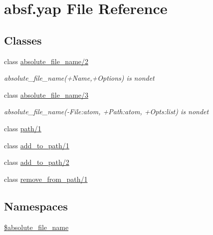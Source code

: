 \section{absf.\+yap File Reference}
\label{absf_8yap}
\subsection*{Classes}
\begin{DoxyCompactItemize}
\item 
class \hyperlink{classabsolute__file__name_22}{absolute\+\_\+file\+\_\+name/2}
\begin{DoxyCompactList}\small\item\em absolute\+\_\+file\+\_\+name(+{\itshape Name},+{\itshape Options}) is nondet \end{DoxyCompactList}\item 
class \hyperlink{classabsolute__file__name_23}{absolute\+\_\+file\+\_\+name/3}
\begin{DoxyCompactList}\small\item\em absolute\+\_\+file\+\_\+name(-\/\+File\+:atom, +\+Path\+:atom, +\+Opts\+:list) is nondet \end{DoxyCompactList}\item 
class \hyperlink{classpath_21}{path/1}
\item 
class \hyperlink{classadd__to__path_21}{add\+\_\+to\+\_\+path/1}
\item 
class \hyperlink{classadd__to__path_22}{add\+\_\+to\+\_\+path/2}
\item 
class \hyperlink{classremove__from__path_21}{remove\+\_\+from\+\_\+path/1}
\end{DoxyCompactItemize}
\subsection*{Namespaces}
\begin{DoxyCompactItemize}
\item 
 \hyperlink{namespace_0Babsolute__file__name}{\$absolute\+\_\+file\+\_\+name}
\end{DoxyCompactItemize}
